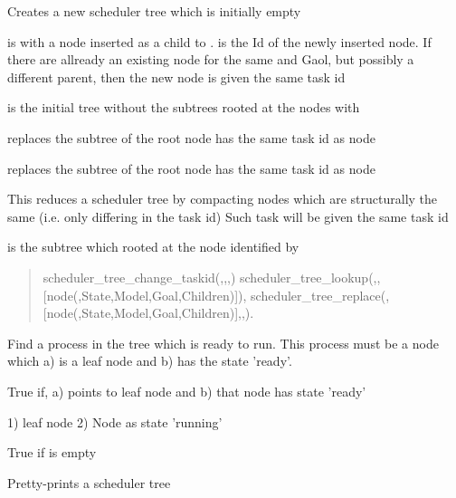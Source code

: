 \begin{description}
Creates a new scheduler tree which is initially empty 

 is  with a node inserted as a child to .
 is the Id of the newly inserted node.
If there are allready an existing node for the same  and Gaol, but possibly
a different parent, then the new node is given the same task id

 is the initial tree without the subtrees rooted at the nodes with  

 replaces the subtree of the root node has the same task id as node

 replaces the subtree of the root node has the same task id as node

This reduces a scheduler tree by compacting nodes which are structurally the same (i.e. only differing in the task id)
Such task will be given the same task id

 is the subtree which rooted at the node identified by 


\begin{quote}
scheduler_tree_change_taskid(,,,) \Sneck{}
scheduler_tree_lookup(,,[node(,State,Model,Goal,Children)]),
scheduler_tree_replace(,[node(,State,Model,Goal,Children)],,).
\end{quote}

Find a process in the tree which is ready to run. This process must be a node which
a) is a leaf node and b) has the state 'ready'.

True if, a)  points to leaf node and b) that node has state 'ready'

1)  \Sdcg{} leaf node
2) Node as state 'running'

True if  is empty

Pretty-prints a scheduler tree
\end{description}


